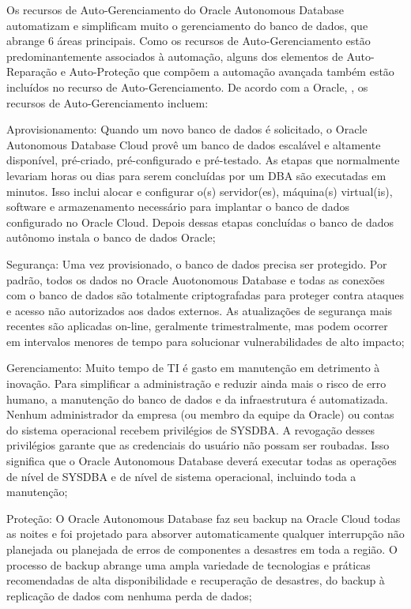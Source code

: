 Os recursos de Auto-Gerenciamento do Oracle Autonomous Database automatizam e simplificam muito o gerenciamento do banco de dados, que abrange 6 áreas principais. Como os recursos de Auto-Gerenciamento estão predominantemente associados à automação, alguns dos elementos de Auto-Reparação e Auto-Proteção que compõem a automação avançada também estão incluídos no recurso de Auto-Gerenciamento. De acordo com a Oracle, \cite{WPGestao}, os recursos de Auto-Gerenciamento incluem:

\begin{alineas}
\item Aprovisionamento: Quando um novo banco de dados é solicitado, o Oracle Autonomous Database Cloud provê um banco de dados escalável e altamente disponível, pré-criado, pré-configurado e pré-testado. As etapas que normalmente levariam horas ou dias para serem concluídas por um DBA são executadas em minutos. Isso inclui alocar e configurar o(s) servidor(es), máquina(s) virtual(is),  software e armazenamento necessário para implantar o banco de dados configurado no Oracle Cloud. Depois dessas etapas concluídas o banco de dados autônomo instala o banco de dados Oracle;

\item Segurança: Uma vez provisionado, o banco de dados precisa ser protegido. Por padrão, todos os dados no Oracle Auotonomous Database e todas as conexões com o banco de dados são totalmente criptografadas para proteger contra ataques e acesso não autorizados aos dados externos. As atualizações de segurança mais recentes são aplicadas on-line, geralmente trimestralmente, mas podem ocorrer em intervalos menores de tempo para solucionar vulnerabilidades de alto impacto;

\item Gerenciamento: Muito tempo de TI é gasto em manutenção em detrimento à inovação. Para simplificar a administração e reduzir ainda mais o risco de erro humano, a manutenção do banco de dados e da infraestrutura é automatizada. Nenhum administrador da empresa (ou membro da equipe da Oracle) ou contas do sistema operacional recebem privilégios de SYSDBA. A revogação desses privilégios garante que as credenciais do usuário não possam ser roubadas. Isso significa que o Oracle Autonomous Database deverá executar todas as operações de nível de SYSDBA e de nível de sistema operacional, incluindo toda a manutenção;

\item Proteção: O Oracle Autonomous Database faz seu backup na Oracle Cloud todas as noites e foi projetado para absorver automaticamente qualquer interrupção não planejada ou planejada de erros de componentes a desastres em toda a região. O processo de backup abrange uma ampla variedade de tecnologias e práticas recomendadas de alta disponibilidade e recuperação de desastres, do backup à replicação de dados com nenhuma perda de dados; 


\end{alineas}

